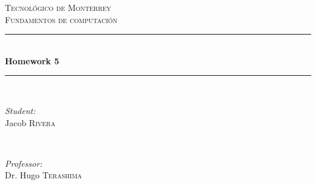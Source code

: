 \documentclass{article}
\begin{document}
\begin{titlepage}

    \newcommand{\HRule}{\rule{\linewidth}{0.5mm}} %

    \center %


    \textsc{\LARGE Tecnológico de Monterrey}\\[1.5cm] %
    \textsc{\Large Fundamentos de computación}\\[0.5cm] %


    \HRule \\[0.4cm]
    { \huge \bfseries Homework 5}\\[0.4cm] %
    \HRule \\[1.5cm]


    \begin{minipage}{0.4\textwidth}
    \begin{flushleft} \large
    \emph{Student:}\\
    Jacob \textsc{Rivera} %
    \end{flushleft}
    \end{minipage}
    ~
    \begin{minipage}{0.4\textwidth}
    \begin{flushright} \large
    \emph{Professor:} \\
    Dr. Hugo \textsc{Terashima} %
    \end{flushright}
    \end{minipage}\\[2cm]


\end{titlepage}
\end{document}
